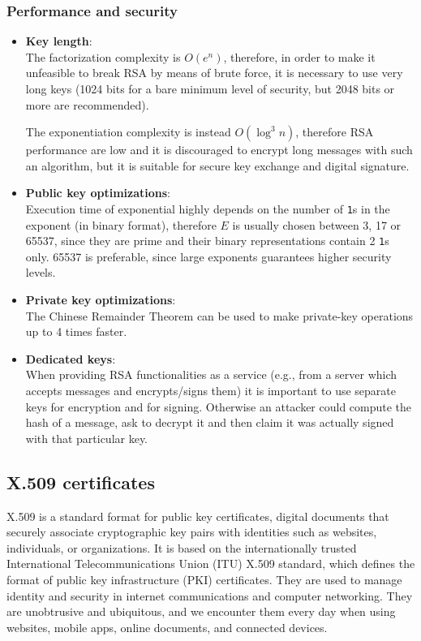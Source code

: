 \subsubsection{Performance and security}\label{subsubsec:perf_and_sec}
\begin{itemize}
	\item \textbf{Key length}:\\
		The factorization complexity is $O(e^n)$, therefore, in order
		to make it unfeasible to break RSA by means of brute force, it
		is necessary to use very long keys (1024 bits for a bare
		minimum level of security, but 2048 bits or more are
		recommended).

		The exponentiation complexity is instead $O(\log^3n)$,
		therefore RSA performance are low and it is discouraged to
		encrypt long messages with such an algorithm, but it is
		suitable for secure key exchange and digital signature.

	\item \textbf{Public key optimizations}:\\
		Execution time of exponential highly depends on the number of
		\texttt{1}s in the exponent (in binary format), therefore $E$
		is usually chosen between 3, 17 or 65537, since they are prime
		and their binary representations contain 2 \texttt{1}s only.
		65537 is preferable, since large exponents guarantees higher
		security levels.

	\item \textbf{Private key optimizations}:\\
		The Chinese Remainder Theorem can be used to make private-key
		operations up to 4 times faster.

	\item \textbf{Dedicated keys}:\\
		When providing RSA functionalities as a service (e.g., from a
		server which accepts messages and encrypts/signs them) it is
		important to use separate keys for encryption and for signing.
		Otherwise an attacker could compute the hash of a message, ask
		to decrypt it and then claim it was actually signed with that
		particular key.
\end{itemize}

\subsection{X.509 certificates}
X.509 is a standard format for public key certificates, digital documents that
securely associate cryptographic key pairs with identities such as websites,
individuals, or organizations.  It is based on the internationally trusted
International Telecommunications Union (ITU) X.509 standard, which defines the
format of public key infrastructure (PKI) certificates. They are used to manage
identity and security in internet communications and computer networking. They
are unobtrusive and ubiquitous, and we encounter them every day when using
websites, mobile apps, online documents, and connected devices.

